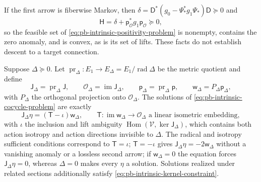 If the first arrow is fiberwise Markov, then
\(\delta=\mathsf D^*(g_0-\Psi_*^*g_1\Psi_*)\mathsf D\succeq0\) and
\begin{equation}
\mathsf H=\delta+\mathsf p_{\mathcal O}^*g_1\mathsf p_{\mathcal O}\succeq0,
\label{eq:pb-defect-markov-budget}
\end{equation}
so the feasible set of \eqref{eq:pb-intrinsic-positivity-problem} is nonempty, contains the zero
anomaly, and is convex, as is its set of lifts. These facts do not establish descent to a target
connection. 

Suppose \(\Delta\succeq0\). Let
\(\operatorname{pr}_\Delta:E_1\to E_\Delta=E_1/\operatorname{rad}\Delta\) be the metric quotient and define
\begin{equation}
\mathsf J_\Delta=\operatorname{pr}_\Delta\mathsf J,\qquad
\mathcal O_\Delta=\operatorname{im}\mathsf J_\Delta,\qquad
\mathsf p_\Delta=\operatorname{pr}_\Delta\mathsf p,\qquad
\mathsf w_\Delta=P_\Delta\mathsf p_\Delta,
\label{eq:pb-defect-cocycle-quotient-data}
\end{equation}
with \(P_\Delta\) the orthogonal projection onto \(\mathcal O_\Delta\). The solutions of
\eqref{eq:pb-intrinsic-cocycle-problem} are exactly
\begin{equation}
\mathsf J_\Delta\eta=(\mathsf T-\iota)\mathsf w_\Delta,\qquad
\mathsf T:\operatorname{im}\mathsf w_\Delta\longrightarrow\mathcal O_\Delta
\text{ a linear isometric embedding},
\label{eq:pb-defect-isometry-parameterization}
\end{equation}
with \(\iota\) the inclusion and lift ambiguity \(\operatorname{Hom}(\mathcal V,\ker\mathsf J_\Delta)\),
which contains both action isotropy and action directions invisible to \(\Delta\). The radical and
isotropy sufficient conditions correspond to \(\mathsf T=\iota\); \(\mathsf T=-\iota\) gives
\(\mathsf J_\Delta\eta=-2\mathsf w_\Delta\) without a vanishing anomaly or a lossless second arrow; if
\(\mathsf w_\Delta=0\) the equation forces \(\mathsf J_\Delta\eta=0\), whereas \(\Delta=0\) makes every
\(\eta\) a solution. Solutions realized under related sections additionally satisfy
\eqref{eq:pb-intrinsic-kernel-constraint}. 

